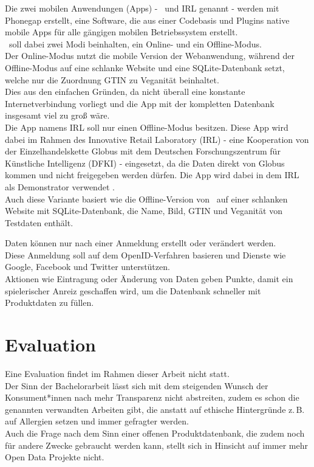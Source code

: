 \documentclass[a4paper,11pt,bibtotoc,headsepline]{scrartcl}
\begin{document}
Die zwei mobilen Anwendungen (Apps) - \name\ und IRL genannt - werden
mit Phonegap erstellt, eine Software, die aus einer Codebasis und
Plugins native mobile Apps für alle gängigen mobilen Betriebssystem
erstellt.\\
\name\ soll dabei zwei Modi beinhalten, ein Online- und ein
Offline-Modus.\\
Der Online-Modus nutzt die mobile Version der Webanwendung, während
der Offline-Modus auf eine schlanke Website und eine SQLite-Datenbank
setzt, welche nur die Zuordnung GTIN zu Veganität beinhaltet.\\
Dies aus den einfachen Gründen, da nicht überall eine konstante
Internetverbindung vorliegt und die App mit der kompletten Datenbank
insgesamt viel zu groß wäre.\\
Die App namens IRL soll nur einen Offline-Modus besitzen. Diese App
wird dabei im Rahmen des Innovative Retail Laboratory (IRL)
- eine Kooperation von der Einzelhandelskette Globus mit dem
Deutschen Forschungszentrum für Künstliche Intelligenz (DFKI) -
eingesetzt, da die Daten direkt von Globus kommen und nicht
freigegeben werden dürfen. Die App wird dabei in dem IRL als
Demonstrator verwendet \cite{sskk09}.\\
Auch diese Variante basiert wie die Offline-Version von \name\ auf
einer schlanken Website mit SQLite-Datenbank, die Name, Bild, GTIN und
Veganität von Testdaten enthält.

Daten können nur nach einer Anmeldung erstellt oder verändert
werden.\\
Diese Anmeldung soll auf dem OpenID-Verfahren basieren und Dienste
wie Google, Facebook und Twitter unterstützen.\\
Aktionen wie Eintragung oder Änderung von Daten geben Punkte, damit
ein spielerischer Anreiz geschaffen wird, um die Datenbank schneller
mit Produktdaten zu füllen.

\section{Evaluation} %

Eine Evaluation findet im Rahmen dieser Arbeit nicht statt.\\
Der Sinn der Bachelorarbeit lässt sich mit dem steigenden Wunsch der
Konsument*innen nach mehr Transparenz
nicht abstreiten, zudem es schon die genannten verwandten Arbeiten
gibt, die anstatt auf ethische Hintergründe z.\,B. auf Allergien setzen
und immer gefragter werden.\\
Auch die Frage nach dem Sinn einer offenen Produktdatenbank, die zudem noch für
andere Zwecke gebraucht werden kann, stellt sich in Hinsicht auf immer
mehr Open Data Projekte nicht.
\end{document}
